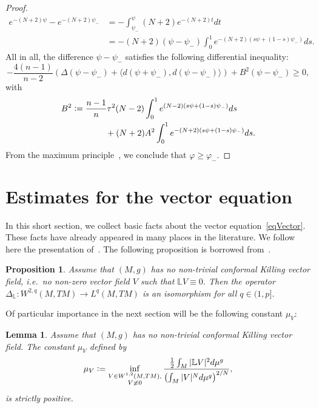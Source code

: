 \documentclass[a4paper, 10pt, reqno]{amsart}
\theoremstyle{plain}
\newtheorem{lemma}[thm]{Lemma}
\newtheorem{proposition}[thm]{Proposition}
\theoremstyle{remark}
\theoremstyle{definition}
\renewcommand{\phi}{\varphi}
\newcommand{\bL}{\mathbb{L}}
\newcommand{\definedas}{\mathrel{\raise.095ex\hbox{\rm :}\mkern-5.2mu=}}
\let\<\langle
\let\>\rangle
\begin{document}
\begin{proof}
    \begin{align*}
        e^{-(N+2)\psi} - e^{-(N+2)\psi_-}
         & = - \int_{\psi_-}^\psi (N+2) e^{-(N+2)t} dt                            \\
         & = - (N+2) (\psi - \psi_-) \int_0^1 e^{-(N+2)(s\psi + (1-s)\psi_-)} ds.
    \end{align*}
    All in all, the difference $\psi - \psi_-$ satisfies the following differential inequality:
    \[
        - \frac{4(n-1)}{n-2} \left(\Delta (\psi - \psi_-) + \< d(\psi+\psi_-), d(\psi-\psi_-)\>\right) + B^2 (\psi - \psi_-) \geq 0,
    \]
    with
    \begin{align*}
        B^2 & \definedas \frac{n-1}{n} \tau^2 (N-2) \int_0^1 e^{(N-2)(s\psi + (1-s)\psi_-)} ds \\
            & \qquad\qquad + (N+2) A^2 \int_0^1 e^{-(N+2)(s\psi + (1-s)\psi_-)} ds.
    \end{align*}
    From the maximum principle~\cite[Theorem 8.1]{GilbargTrudinger}, we conclude
    that $\phi \geq \phi_-$.
\end{proof}


\section{Estimates for the vector equation}\label{secVector}
In this short section, we collect basic facts about the vector
equation~\eqref{eqVector}. These facts have already appeared in many places in
the literature. We follow here the presentation of~\cite{GicquaudUniqueness}.
The following proposition is borrowed from~\cite[Proposition 3.1]{Pailleron}.

\begin{proposition}\label{propVector}
    Assume that $(M, g)$ has no non-trivial conformal Killing vector field, i.e.\
    no non-zero vector field $V$ such that $\bL V \equiv 0$. Then the operator
    $\Delta_{\bL}: W^{2, q}(M, TM) \to L^q(M, TM)$ is an isomorphism for all $q \in
        (1, p]$.
\end{proposition}

Of particular importance in the next section will be the following constant
$\mu_V$:

\begin{lemma}\label{lmVector}
    Assume that $(M, g)$ has no non-trivial conformal Killing vector field. The constant $\mu_V$ defined by
    \begin{equation}\label{eqDefMuV}
        \mu_V \definedas \inf_{\substack{V \in W^{1, 2}(M, TM),\\ V \not\equiv 0}}
        \frac{\frac{1}{2}\int_M |\bL V|^2 d\mu^g}{\left(\int_M |V|^N d\mu^g\right)^{2/N}},
    \end{equation}
    is strictly positive.
\end{lemma}
\end{document}

